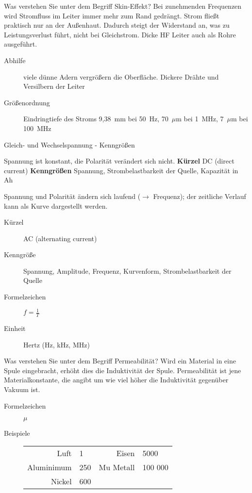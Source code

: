 \documentclass[avery5371,grid,frame,a4paper]{flashcards}
\newcommand{\card}[3]{
  \begin{flashcard}[{\chap} -- #1]{#2}#3\end{flashcard}
}
\begin{document}
\card{08}{Was verstehen Sie unter dem Begriff Skin-Effekt?}{
  \small
  Bei zunehmenden Frequenzen wird Stromfluss im Leiter immer mehr zum Rand gedrängt.
  Strom fließt praktisch nur an der Außenhaut.
  Dadurch steigt der Widerstand an, was zu Leistungsverlust führt, nicht bei Gleichstrom.
  Dicke HF Leiter auch als Rohre ausgeführt.
  \begin{description}
    \item[Abhilfe] viele dünne Adern vergrößern die Oberfläche. Dickere Drähte und Versilbern der Leiter
    \item[Größenordnung] Eindringtiefe des Stroms
      9,\SI{38}{\milli\metre} bei 50~Hz, 70~$\mu$m bei 1~MHz, 7~$\mu$m bei \SI{100}{\mega\Hz}
  \end{description}
}

\card{09}{Gleich- und Wechselspannung - Kenngrößen}{
  \scriptsize
  \begin{description}\itemsep0pt
    \item[Gleichspannung] Spannung ist konstant, die Polarität verändert sich nicht. \textbf{Kürzel} DC (direct current) \textbf{Kenngrößen} Spannung, Strombelastbarkeit der Quelle, Kapazität in Ah
    \item[Wechselspannung]\itemsep0pt
      Spannung und Polarität ändern sich laufend ($\rightarrow$ Frequenz); der zeitliche Verlauf kann als Kurve dargestellt werden. 
      \begin{description}
        \item[Kürzel] AC (alternating current)
        \item[Kenngröße] Spannung, Amplitude, Frequenz, Kurvenform, Strombelastbarkeit der Quelle
        \item[Formelzeichen] $f = \frac1T$
        \item[Einheit] Hertz (Hz, kHz, MHz)
      \end{description}
  \end{description}
}


\card{10}{Was verstehen Sie unter dem Begriff Permeabilität?}{
  Wird ein Material in eine Spule eingebracht, erhöht dies die Induktivität der Spule.
  Permeabilität ist jene Materialkonstante, die angibt um wie viel höher die Induktivität
  gegenüber Vakuum ist.
  \begin{description}
    \item[Formelzeichen] $\mu$
    \item[Beispiele]
      \begin{tabular}{rlrl}
        Luft       & 1      & Eisen      & 5000 \\
        Aluminimum & 250    & Mu Metall  & 100 000 \\
        Nickel     & 600    &            & \\
      \end{tabular}
  \end{description}
}
\end{document}
